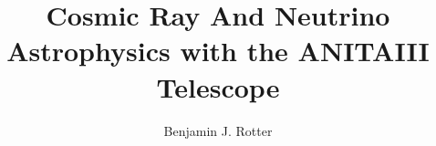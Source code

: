 \documentclass[11pt,dissertation]{uhthesis}
\title{Cosmic Ray And Neutrino Astrophysics with the ANITAIII Telescope}
\author{Benjamin J. Rotter}
\begin{document}

\begin{frontmatter}



%

%



\tableofcontents

\listoftables

\listoffigures

\end{frontmatter}








\end{document}
